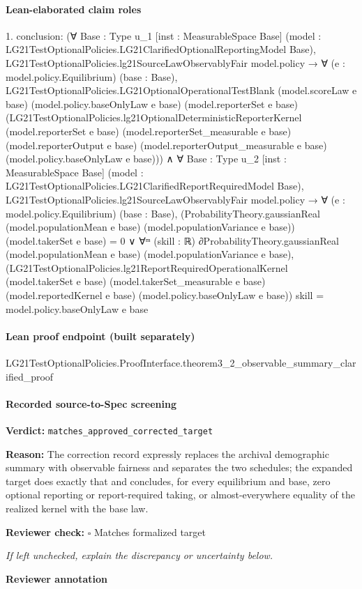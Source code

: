 \documentclass[10pt]{article}
\newcommand{\reviewerbox}{%
  \par\noindent\fbox{\parbox{0.96\linewidth}{\rule{0pt}{0.38in}}}\par
}
\newcommand{\reviewmatch}[1]{%
  \par\noindent\textbf{Reviewer check:} $\square$\; #1\par
  \noindent\emph{If left unchecked, explain the discrepancy or uncertainty below.}\par
}
\begin{document}
\paragraph{Lean-elaborated claim roles}\begin{ReviewVerbatim}
1. conclusion: (∀ {Base : Type u_1} [inst : MeasurableSpace Base]
    (model : LG21TestOptionalPolicies.LG21ClarifiedOptionalReportingModel Base),
    LG21TestOptionalPolicies.lg21SourceLawObservablyFair model.policy →
      ∀ (e : model.policy.Equilibrium) (base : Base),
        LG21TestOptionalPolicies.LG21OptionalOperationalTestBlank (model.scoreLaw e base)
          (model.policy.baseOnlyLaw e base) (model.reporterSet e base)
          (LG21TestOptionalPolicies.lg21OptionalDeterministicReporterKernel (model.reporterSet e base)
            (model.reporterSet_measurable e base) (model.reporterOutput e base) (model.reporterOutput_measurable e base)
            (model.policy.baseOnlyLaw e base))) ∧
  ∀ {Base : Type u_2} [inst : MeasurableSpace Base]
    (model : LG21TestOptionalPolicies.LG21ClarifiedReportRequiredModel Base),
    LG21TestOptionalPolicies.lg21SourceLawObservablyFair model.policy →
      ∀ (e : model.policy.Equilibrium) (base : Base),
        (ProbabilityTheory.gaussianReal (model.populationMean e base) (model.populationVariance e base))
              (model.takerSet e base) =
            0 ∨
          ∀ᵐ (skill :
            ℝ) ∂ProbabilityTheory.gaussianReal (model.populationMean e base) (model.populationVariance e base),
            (LG21TestOptionalPolicies.lg21ReportRequiredOperationalKernel (model.takerSet e base)
                  (model.takerSet_measurable e base) (model.reportedKernel e base) (model.policy.baseOnlyLaw e base))
                skill =
              model.policy.baseOnlyLaw e base
\end{ReviewVerbatim}

\paragraph{Lean proof endpoint (built separately)}\begin{ReviewVerbatim}
LG21TestOptionalPolicies.ProofInterface.theorem3_2_observable_summary_clarified_proof
\end{ReviewVerbatim}

\paragraph{Recorded source-to-Spec screening}
\textbf{Verdict:} \texttt{matches\_approved\_corrected\_target}
\\
{\raggedright
\textbf{Reason:} The correction record expressly replaces the archival demographic summary with observable fairness and separates the two schedules;\allowbreak{} the expanded target does exactly that and concludes, for every equilibrium and base, zero optional reporting or report-\allowbreak{}required taking, or almost-\allowbreak{}everywhere equality of the realized kernel with the base law.\allowbreak{}
\par}
\reviewmatch{Matches formalized target}
\noindent\textbf{Reviewer annotation}\par
\reviewerbox
\end{document}
